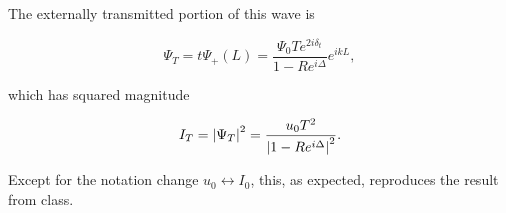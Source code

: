 {The externally transmitted portion of this wave is

\begin{dmath}\label{eqn:modernOptics:problemSet3:2:400}
\Psi_T 
= 
t \Psi_{+}(L) 
= 
\frac{\Psi_0 T e^{2 i \delta_t} }{1 - R e^{ i \Delta} }
e^{i k L},
\end{dmath}

which has squared magnitude

\begin{dmath}\label{eqn:modernOptics:problemSet3:2:420}
I_T 
= \Abs{\Psi_T}^2
= \frac{u_0 T^2}{\Abs{1 - R e^{i \Delta}}^2}.
\end{dmath}

Except for the notation change $u_0 \leftrightarrow I_0$, this, as expected, reproduces the result from class.

} %
